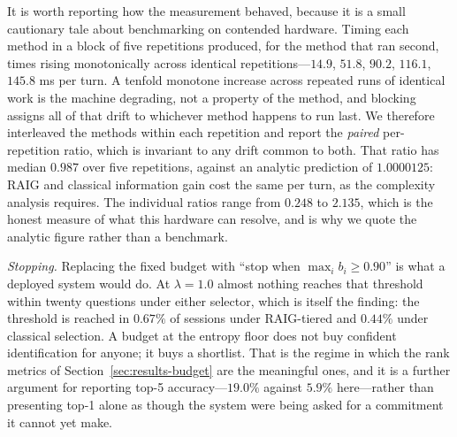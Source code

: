 It is worth reporting how the measurement behaved, because it is a small
cautionary tale about benchmarking on contended hardware. Timing each method in
a block of five repetitions produced, for the method that ran second, times
rising monotonically across identical repetitions---$14.9$, $51.8$, $90.2$,
$116.1$, $145.8$ ms per turn. A tenfold monotone increase across repeated runs
of identical work is the machine degrading, not a property of the method, and
blocking assigns all of that drift to whichever method happens to run last. We
therefore interleaved the methods within each repetition and report the
\emph{paired} per-repetition ratio, which is invariant to any drift common to
both. That ratio has median $0.987$ over five repetitions, against an analytic
prediction of $1.0000125$: RAIG and classical information gain cost the same
per turn, as the complexity analysis requires. The individual ratios range from
$0.248$ to $2.135$, which is the honest measure of what this hardware can
resolve, and is why we quote the analytic figure rather than a benchmark.

\emph{Stopping.} Replacing the fixed budget with ``stop when
$\max_i b_i \ge 0.90$'' is what a deployed system would do. At
$\lambda = 1.0$ almost nothing reaches that threshold within twenty questions
under either selector, which is itself the finding: the threshold is reached in
$0.67\%$ of sessions under RAIG-tiered and $0.44\%$ under classical selection.
A budget at the entropy floor does not buy confident identification for anyone;
it buys a shortlist. That is the regime in which the rank metrics of
Section~\ref{sec:results-budget} are the meaningful ones, and it is a further
argument for reporting top-5 accuracy---$19.0\%$ against $5.9\%$ here---rather
than presenting top-1 alone as though the system were being asked for a
commitment it cannot yet make.
